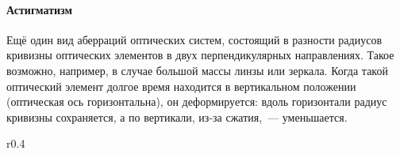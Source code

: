 
\paragraph{Астигматизм} Ещё один вид аберраций оптических систем, состоящий в разности радиусов кривизны оптических элементов в двух перпендикулярных направлениях. Такое возможно, например, в случае большой массы линзы или зеркала. Когда такой оптический элемент долгое время находится в вертикальном положении (оптическая ось горизонтальна), он деформируется: вдоль горизонтали радиус кривизны сохраняется, а по вертикали, из-за сжатия,~--- уменьшается.

\begin{wrapfigure}[13]{r}{0.4\tw}
    \vspace{-0.8pc}
    \centering
\end{wrapfigure}
